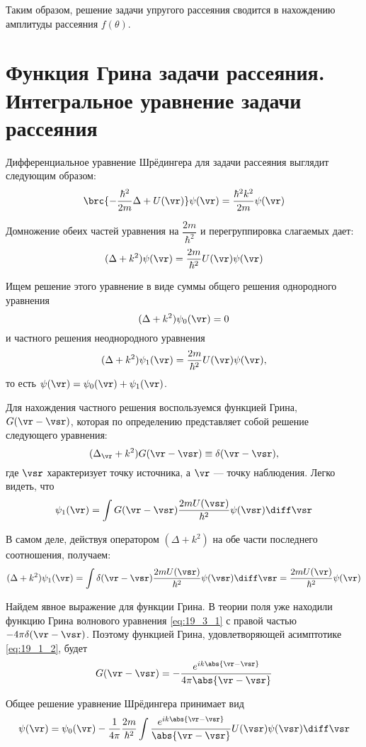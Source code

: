 Таким образом, решение задачи упругого рассеяния сводится в нахождению амплитуды рассеяния $f(\theta)$.

\section{Функция Грина задачи рассеяния. Интегральное уравнение задачи рассеяния}

Дифференциальное уравнение Шрёдингера для задачи рассеяния выглядит следующим образом:
$$
\brc{-\frac{\hbar^2}{2m} \Delta + U(\vr)}\psi(\vr) = \frac{\hbar^2 k^2}{2m} \psi(\vr)
$$

Домножение обеих частей уравнения на $\dfrac{2m}{\hbar^2}$ и перегруппировка слагаемых дает:
$$
(\Delta + k^2) \psi(\vr) = \frac{2m}{\hbar^2}U(\vr)\psi(\vr)
$$

Ищем решение этого уравнение в виде суммы общего решения однородного уравнения
$$
(\Delta + k^2) \psi_0(\vr) = 0
$$
и частного решения неоднородного уравнения
$$
(\Delta + k^2) \psi_1(\vr) = \frac{2m}{\hbar^2}U(\vr)\psi(\vr),
$$
то есть $\psi(\vr)=\psi_0(\vr) + \psi_1(\vr)$.

Для нахождения частного решения воспользуемся функцией Грина, ${G(\vr-\vsr)}$, которая по определению представляет собой решение следующего уравнения:
\begin{equation}
\label{eq:19_3_1}
(\Delta_{\vr} + k^2)G(\vr - \vsr) \equiv \delta(\vr - \vsr),
\end{equation}
где $\vsr$ характеризует точку источника, а $\vr$ --- точку наблюдения. Легко видеть, что
$$
\psi_1(\vr) = \int G(\vr - \vsr) \frac{2m U(\vsr)}{\hbar^2} \psi(\vsr) \diff\vsr
$$

В самом деле, действуя оператором $(\Delta + k^2)$ на обе части последнего соотношения, получаем:
$$
(\Delta + k^2) \psi_1(\vr) = \int \delta(\vr - \vsr) \frac{2m U(\vsr)}{\hbar^2} \psi(\vsr) \diff\vsr = \frac{2m U(\vr)}{\hbar^2} \psi(\vr)
$$

Найдем явное выражение для функции Грина. В теории поля уже находили функцию Грина волнового уравнения \eqref{eq:19_3_1} с правой частью $-4\pi \delta(\vr - \vsr)$. Поэтому функцией Грина, удовлетворяющей асимптотике \eqref{eq:19_1_2}, будет
$$
G(\vr - \vsr) = - \frac{e^{ik\abs{\vr - \vsr}}}{4\pi\abs{\vr - \vsr}}
$$

Общее решение уравнение Шрёдингера принимает вид
$$
\psi(\vr) = \psi_0(\vr) - \frac{1}{4 \pi}\frac{2m}{\hbar^2}\int \frac{e^{ik\abs{\vr - \vsr}}}{\abs{\vr - \vsr}} U(\vsr)\psi(\vsr)\diff\vsr
$$

